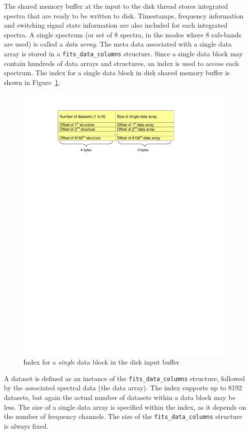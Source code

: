 \documentclass[11pt]{article} %
\begin{document}
The shared memory buffer at the input to the disk thread stores integrated spectra that are ready to be written to disk. Timestamps, frequency information and switching signal state information are also included for each integrated spectra. A single spectrum (or set of 8 spectra, in the modes where 8 sub-bands are used) is called a {\em data array}. The meta data associated with a single data array is stored in a \texttt{fits\_data\_columns} structure. Since a single data block may contain hundreds of data arrays and structures, an index is used to access each spectrum. The index for a single data block in disk shared memory buffer is shown in Figure~\ref{vegas-disk-index}.

\begin{figure}[!ht]
\centering
\includegraphics*[width=11cm, viewport = 80 650 460 790]{figures/vegas-disk-index.pdf}
\caption{Index for a {\em single} data block in the disk input buffer}
\label{vegas-disk-index}
\end{figure}

A dataset is defined as an instance of the \texttt{fits\_data\_columns} structure, followed by the associated spectral data (the data array). The index supports up to 8192 datasets, but again the actual number of datasets within a data block may be less. The size of a single data array is specified within the index, as it depends on the number of frequency channels. The size of the \texttt{fits\_data\_columns} structure is always fixed.
\end{document}
